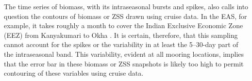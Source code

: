 \documentclass[authoryear,review,11pt]{elsarticle}
\begin{document}
The time series of biomass, with its intraseasonal bursts and spikes, also calls into question the contours of biomass or ZSS drawn using cruise data.  In the EAS, for example, it takes roughly a month to cover the Indian Exclusive Economic Zone (EEZ) from Kanyakumari to Okha \citep[see, for example,][]{shetye1990hydrography, shetye19911517, vijith2022circulation, madhupratap1996lack, jyothibabu2010re}. It is certain, therefore, that this sampling cannot account for the spikes or the variability in at least the 5--30-day part of the intraseasonal band. This variability, evident at all mooring locations, implies that the error bar in these biomass or ZSS snapshots is likely too high to permit contouring of these variables using cruise data.


\end{document}
